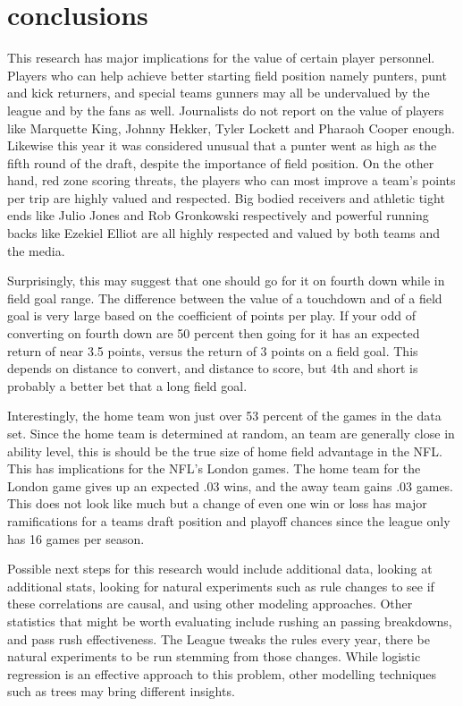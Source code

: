 \documentclass[12pt,english]{article}
\begin{document}
\section{conclusions}

This research has major implications for the value of certain player personnel.  Players who can help achieve better starting field position namely punters, punt and kick returners, and special teams gunners may all be undervalued by the league and by the fans as well.  Journalists do not report on the value of players like Marquette King, Johnny Hekker, Tyler Lockett and Pharaoh Cooper enough.  Likewise this year it was considered unusual that a punter went as high as the fifth round of the draft, despite the importance of field position.  On the other hand, red zone scoring threats, the players who can most improve a team's points per trip are highly valued and respected.  Big bodied receivers and athletic tight ends like Julio Jones and Rob Gronkowski respectively and powerful running backs like Ezekiel Elliot are all highly respected and valued by both teams and the media.

Surprisingly, this may suggest that one should go for it on fourth down while in field goal range.  The difference between the value of a touchdown and of a field goal is very large based on the coefficient of points per play.  If your odd of converting on fourth down are 50 percent then going for it has an expected return of near 3.5 points, versus the return of 3 points on a field goal.  This depends on distance to convert, and distance to score, but 4th and short is probably a better bet that a long field goal.

Interestingly, the home team won just over 53 percent of the games in the data set.  Since the home team is determined at random, an team are generally close in ability level, this is should be the true size of home field advantage in the NFL.  This has implications for the NFL's London games.  The home team for the London game gives up an expected .03 wins, and the away team gains .03 games.  This does not look like much but a change of even one win or loss has major ramifications for a teams draft position and playoff chances since the league only has 16 games per season.

Possible next steps for this research would include additional data, looking at additional stats, looking for natural experiments such as rule changes to see if these correlations are causal, and using other modeling approaches.  Other statistics that might be worth evaluating include rushing an passing breakdowns, and pass rush effectiveness.  The League tweaks the rules every year, there be natural experiments to be run stemming from those changes.  While logistic regression is an effective approach to this problem, other modelling techniques such as trees may bring different insights. 
\end{document}
